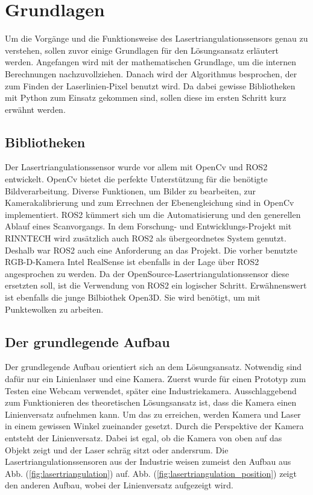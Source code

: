 \section{Grundlagen}\label{grundlagen}
	Um die Vorgänge und die Funktionsweise des Lasertriangulationssensors genau zu verstehen, sollen zuvor einige Grundlagen für den Lösungsansatz erläutert werden. Angefangen wird mit der mathematischen Grundlage, um die internen Berechnungen nachzuvollziehen. Danach wird der Algorithmus besprochen, der zum Finden der Laserlinien-Pixel benutzt wird. Da dabei gewisse Bibliotheken mit Python zum Einsatz gekommen sind, sollen diese im ersten Schritt kurz erwähnt werden.
	
	\subsection{Bibliotheken}
	Der Lasertriangulationssensor wurde vor allem mit OpenCv und ROS2 entwickelt. OpenCv bietet die perfekte Unterstützung für die benötigte Bildverarbeitung. Diverse Funktionen, um Bilder zu bearbeiten, zur Kamerakalibrierung und zum Errechnen der Ebenengleichung sind in OpenCv implementiert. \newline
	ROS2 kümmert sich um die Automatisierung und den generellen Ablauf eines Scanvorgangs. In dem Forschung- und Entwicklungs-Projekt mit RINNTECH wird zusätzlich auch ROS2 als übergeordnetes System genutzt. Deshalb war ROS2 auch eine Anforderung an das Projekt. Die vorher benutzte RGB-D-Kamera Intel RealSense ist ebenfalls in der Lage über ROS2 angesprochen zu werden. Da der OpenSource-Lasertriangulationssensor diese ersetzten soll, ist die Verwendung von ROS2 ein logischer Schritt. \newline
	Erwähnenswert  ist ebenfalls die junge Bilbiothek Open3D. Sie wird benötigt, um mit Punktewolken zu arbeiten.
	
	\subsection{Der grundlegende Aufbau}
	Der grundlegende Aufbau orientiert sich an dem Lösungsansatz. Notwendig sind dafür nur ein Linienlaser und eine Kamera. Zuerst wurde für einen Prototyp zum Testen eine Webcam verwendet, später eine Industriekamera. Ausschlaggebend zum Funktionieren des theoretischen Lösungsansatz ist, dass die Kamera einen Linienversatz aufnehmen kann. Um das zu erreichen, werden Kamera und Laser in einem gewissen Winkel zueinander gesetzt. Durch die Perspektive der Kamera entsteht der Linienversatz. Dabei ist egal, ob die Kamera von oben auf das Objekt zeigt und der Laser schräg sitzt oder andersrum. Die Lasertriangulationssensoren aus der Industrie weisen zumeist den Aufbau aus Abb. (\ref{fig:lasertriangulation}) auf. Abb. (\ref{fig:lasertriangulation_position}) zeigt den anderen Aufbau, wobei der Linienversatz aufgezeigt wird.
	
